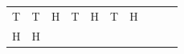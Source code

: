 {{\begin{center}
\begin{tabular}[t]{|l|l|l|l|l|l|l|l|l|l|}
        T &
    
    
        T &
    
    
        H &
    
    
        T &
    
    
        H &
    
    
        T &
    
    
        H%
     \tabularnewline\cline{1-1}\cline{2-2}\cline{3-3}\cline{4-4}\cline{5-5}\cline{6-6}\cline{7-7}\cline{8-8}\cline{9-9}\cline{10-10}
    
    
        H &
    
    
        H &
    

\end{tabular}
\end{center}}}
